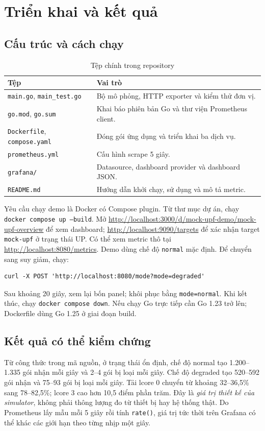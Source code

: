 \documentclass[12pt,a4paper]{report}
\newcommand{\code}[1]{\texttt{#1}}
\begin{document}
\chapter{Triển khai và kết quả}
\section{Cấu trúc và cách chạy}
\begin{table}[H]
\centering\small
\caption{Tệp chính trong repository}
\begin{tabularx}{\textwidth}{p{5.1cm}Y}
\toprule
\textbf{Tệp} & \textbf{Vai trò} \\
\midrule
\code{main.go}, \code{main\_test.go} & Bộ mô phỏng, HTTP exporter và kiểm thử đơn vị. \\
\code{go.mod}, \code{go.sum} & Khai báo phiên bản Go và thư viện Prometheus client. \\
\code{Dockerfile}, \code{compose.yaml} & Đóng gói ứng dụng và triển khai ba dịch vụ. \\
\code{prometheus.yml} & Cấu hình scrape 5 giây. \\
\code{grafana/} & Datasource, dashboard provider và dashboard JSON. \\
\code{README.md} & Hướng dẫn khởi chạy, sử dụng và mô tả metric. \\
\bottomrule
\end{tabularx}
\end{table}

Yêu cầu chạy demo là Docker có Compose plugin. Từ thư mục dự án, chạy \code{docker compose up --build}. Mở \url{http://localhost:3000/d/mock-upf-demo/mock-upf-overview} để xem dashboard; \url{http://localhost:9090/targets} để xác nhận target \code{mock-upf} ở trạng thái UP. Có thể xem metric thô tại \url{http://localhost:8080/metrics}. Demo dùng chế độ \code{normal} mặc định. Để chuyển sang suy giảm, chạy:
\begin{lstlisting}
curl -X POST 'http://localhost:8080/mode?mode=degraded'
\end{lstlisting}
Sau khoảng 20 giây, xem lại bốn panel; khôi phục bằng \code{mode=normal}. Khi kết thúc, chạy \code{docker compose down}. Nếu chạy Go trực tiếp cần Go 1.23 trở lên; Dockerfile dùng Go 1.25 ở giai đoạn build.

\section{Kết quả có thể kiểm chứng}
Từ công thức trong mã nguồn, ở trạng thái ổn định, chế độ normal tạo 1.200--1.335 gói nhận mỗi giây và 2--4 gói bị loại mỗi giây. Chế độ degraded tạo 520--592 gói nhận và 75--93 gói bị loại mỗi giây. Tải lcore 0 chuyển từ khoảng 32--36,5\% sang 78--82,5\%; lcore 3 cao hơn 10,5 điểm phần trăm. Đây là \emph{giá trị thiết kế của simulator}, không phải thông lượng đo từ thiết bị hay hệ thống thật. Do Prometheus lấy mẫu mỗi 5 giây rồi tính \code{rate()}, giá trị tức thời trên Grafana có thể khác các giới hạn theo từng nhịp một giây.
\end{document}
